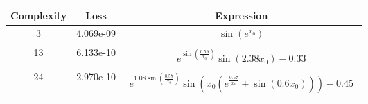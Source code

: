 \begin{center}
        \begin{tabular}{|c|c|c|}
        \hline
        Complexity & Loss & Expression \\
        \hline
        3 & 4.069e-09 & $\begin{aligned}\sin{\left(e^{x_{0}} \right)}\end{aligned}$\\ \hline13 & 6.133e-10 & $\begin{aligned}e^{\sin{\left(\frac{0.59}{x_{0}} \right)}} \sin{\left(2.38 x_{0} \right)} - 0.33\end{aligned}$\\ \hline24 & 2.970e-10 & $\begin{aligned}e^{1.08 \sin{\left(\frac{0.57}{x_{0}} \right)}} \sin{\left(x_{0} \left(e^{\frac{0.57}{x_{0}}} + \sin{\left(0.6 x_{0} \right)}\right) \right)} - 0.45\end{aligned}$\\ \hline\end{tabular}
        \end{center}
        